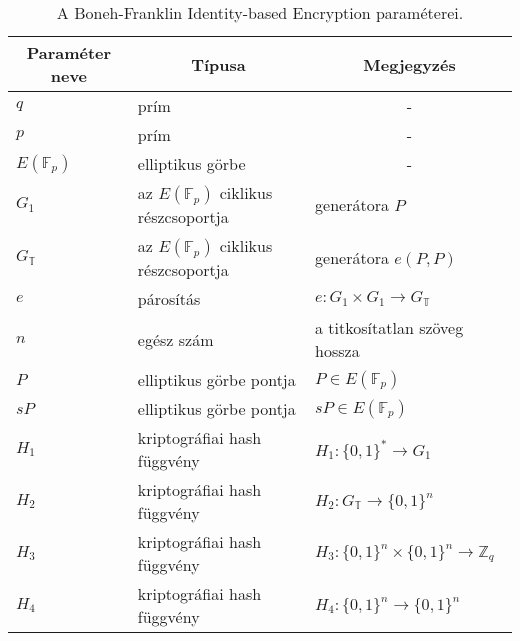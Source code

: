 \begin{table}[H]
    \centering
    \begin{tabular}{|l|l|l|}
        \hline
        \multicolumn{1}{|c|}{\textbf{Paraméter neve}} & \multicolumn{1}{c|}{\textbf{Típusa}} & \multicolumn{1}{c|}{\textbf{Megjegyzés}}              \\ \hline
        $q$                                                  & prím                                 & \multicolumn{1}{c|}{-}                                        \\ \hline
        $p$                                                  & prím                                 & \multicolumn{1}{c|}{-}                                        \\ \hline
        $E(\mathbb{F}_p)$                                     & elliptikus görbe                     & \multicolumn{1}{c|}{-}                                        \\ \hline
        $G_1$                                                & az $E(\mathbb{F}_p)$ ciklikus részcsoportja                     & generátora $P$            \\ \hline
        $G_\mathbb{T}$                                                & az $E(\mathbb{F}_p)$ ciklikus részcsoportja                     & generátora $e(P, P)$        \\ \hline
        $e$                                                  & párosítás                            & $e : G_1 \times G_1 \rightarrow G_\mathbb{T}$                          \\ \hline
        $n$                                                  & egész szám                           & a titkosítatlan szöveg hossza                                 \\ \hline
        $P$                                                  & elliptikus görbe pontja              & $P \in E(\mathbb{F}_p)$                                        \\ \hline
        $sP$                                                 & elliptikus görbe pontja              & $sP \in E(\mathbb{F}_p)$                  \\ \hline
        $H_1$                                                & kriptográfiai hash függvény          & $H_1 : \{0, 1\}^* \rightarrow G_1$                            \\ \hline
        $H_2$                                                & kriptográfiai hash függvény          & $H_2 : G_\mathbb{T} \rightarrow \{0, 1\}^n$                            \\ \hline
        $H_3$                                                & kriptográfiai hash függvény          & $H_3 : \{0, 1\}^n \times \{0, 1\}^n \rightarrow \mathbb{Z}_q$ \\ \hline
        $H_4$                                                & kriptográfiai hash függvény          & $H_4 : \{0, 1\}^n \rightarrow \{0, 1\}^n$                     \\ \hline
    \end{tabular}
    \caption{A Boneh-Franklin Identity-based Encryption paraméterei.}
    \label{table::IBEParams}
\end{table}

